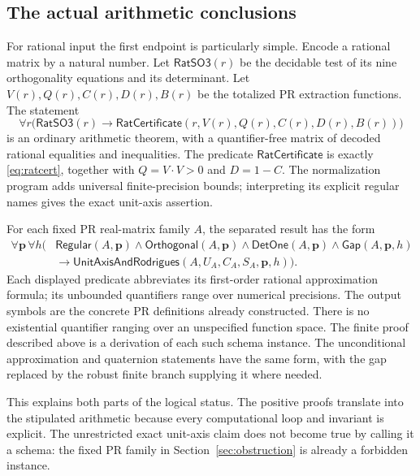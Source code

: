 \subsection{The actual arithmetic conclusions}
For rational input the first endpoint is particularly simple. Encode a
rational matrix by a natural number. Let $\mathsf{RatSO3}(r)$ be the
decidable test of its nine orthogonality equations and its determinant.
Let $V(r),Q(r),C(r),D(r),B(r)$ be the totalized PR extraction functions.
The statement
\[
 \forall r\bigl(\mathsf{RatSO3}(r)\longrightarrow
   \mathsf{RatCertificate}(r,V(r),Q(r),C(r),D(r),B(r))\bigr)
\]
is an ordinary arithmetic theorem, with a quantifier-free matrix of
decoded rational equalities and inequalities. The predicate
$\mathsf{RatCertificate}$ is exactly \eqref{eq:ratcert}, together with
$Q=V\cdot V>0$ and $D=1-C$. The normalization program adds universal
finite-precision bounds; interpreting its explicit regular names gives
the exact unit-axis assertion.

For each fixed PR real-matrix family $A$, the separated result has the
form
\begin{equation}\label{eq:object-schema}
\begin{split}
 \forall\mathbf p\,\forall h\bigl(&\mathsf{Regular}(A,\mathbf p)
 \wedge\mathsf{Orthogonal}(A,\mathbf p)
 \wedge\mathsf{DetOne}(A,\mathbf p)
 \wedge\mathsf{Gap}(A,\mathbf p,h)\\
 &\longrightarrow\mathsf{UnitAxisAndRodrigues}
       (A,U_A,C_A,S_A,\mathbf p,h)\bigr).
\end{split}
\end{equation}
Each displayed predicate abbreviates its first-order rational
approximation formula; its unbounded quantifiers range over numerical
precisions. The output symbols are the concrete PR definitions already
constructed. There is no existential quantifier ranging over an
unspecified function space. The finite proof described above is a
derivation of each such schema instance. The unconditional approximation
and quaternion statements have the same form, with the gap replaced by
the robust finite branch supplying it where needed.

This explains both parts of the logical status. The positive proofs
translate into the stipulated arithmetic because every computational
loop and invariant is explicit. The unrestricted exact unit-axis claim
does not become true by calling it a schema: the fixed PR family in
Section~\ref{sec:obstruction} is already a forbidden instance.

